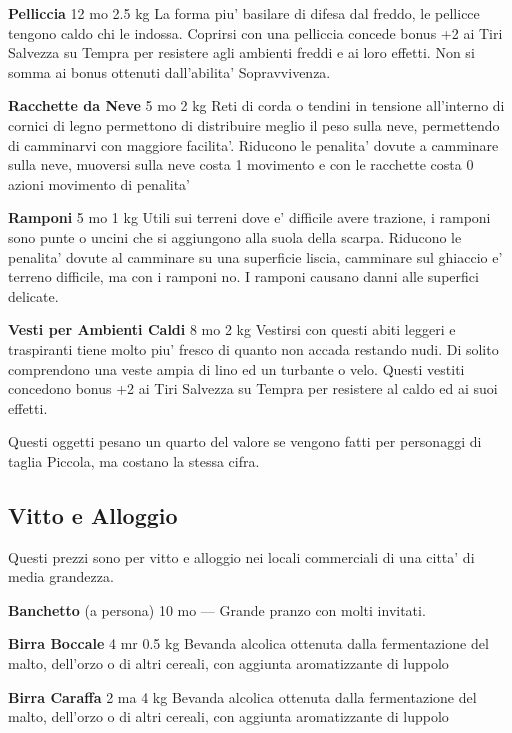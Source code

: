 \documentclass[a4paper,11pt,twoside,openany]{book}
\begin{document}
{\textbf{Pelliccia} 12 mo 2.5 kg La forma piu' basilare di difesa dal freddo, le pellicce tengono caldo chi le indossa. Coprirsi con una pelliccia concede bonus +2 ai Tiri Salvezza su Tempra per resistere agli ambienti freddi e ai loro effetti. Non si somma ai bonus ottenuti dall'abilita' Sopravvivenza.

\textbf{Racchette da Neve} 5 mo 2 kg Reti di corda o tendini in tensione all'interno di cornici di legno permettono di distribuire meglio il peso sulla neve, permettendo di camminarvi con maggiore facilita'. Riducono le penalita' dovute a camminare sulla neve, muoversi sulla neve costa 1 movimento e con le racchette costa 0 azioni movimento di penalita'

\textbf{Ramponi} 5 mo 1 kg Utili sui terreni dove e' difficile avere trazione, i ramponi sono punte o uncini che si aggiungono alla suola della scarpa. Riducono le penalita' dovute al camminare su una superficie liscia, camminare sul ghiaccio e' terreno difficile, ma con i ramponi no. I ramponi causano danni alle superfici delicate.

\textbf{Vesti per Ambienti Caldi} 8 mo 2 kg Vestirsi con questi abiti leggeri e traspiranti tiene molto piu' fresco di quanto non accada restando nudi. Di solito comprendono una veste ampia di lino ed un turbante o velo. Questi vestiti concedono bonus +2 ai Tiri Salvezza su Tempra per resistere al caldo ed ai suoi effetti. 

Questi oggetti pesano un quarto del valore se vengono fatti per personaggi
di taglia Piccola, ma costano la stessa cifra.

\pagebreak

\subsection{Vitto e Alloggio}

\label{vitto-e-alloggio}

Questi prezzi sono per vitto e alloggio nei locali commerciali di una citta' di media grandezza.

\textbf{Banchetto} (a persona) 10 mo --- Grande pranzo con molti invitati.

\textbf{Birra Boccale} 4 mr 0.5 kg Bevanda alcolica ottenuta dalla fermentazione del malto, dell'orzo o di altri cereali, con aggiunta aromatizzante di luppolo

\textbf{Birra Caraffa} 2 ma 4 kg Bevanda alcolica ottenuta dalla fermentazione del malto, dell'orzo o di altri cereali, con aggiunta aromatizzante di luppolo

}
\end{document}
